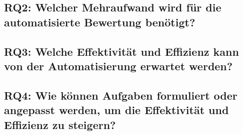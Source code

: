 \subsection[RQ2]{RQ2: Welcher Mehraufwand wird für die automatisierte Bewertung benötigt?}\label{subsec:rq2-additional-effort}


\subsection[RQ3]{RQ3: Welche Effektivität und Effizienz kann von der Automatisierung erwartet werden?}\label{subsec:rq3-effectivity-efficiency}


\subsection[RQ4]{RQ4: Wie können Aufgaben formuliert oder angepasst werden, um die Effektivität und Effizienz zu steigern?}\label{subsec:rq4-improve-effectivity-efficiency}

